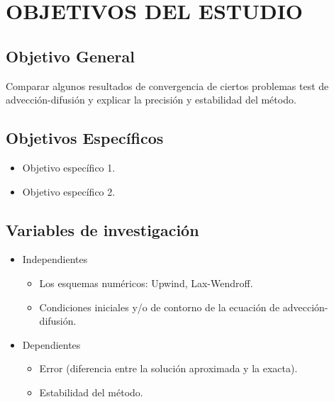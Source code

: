 \section{OBJETIVOS DEL ESTUDIO}
\subsection{Objetivo General}

Comparar algunos resultados de convergencia de ciertos problemas
test de advección-difusión y explicar la precisión y estabilidad del método.

\subsection{Objetivos Específicos}
\begin{itemize}
	\item Objetivo específico 1.

	\item Objetivo específico 2.
\end{itemize}

\subsection{Variables de investigación}

\begin{itemize}
	\item Independientes

	      \begin{itemize}
		      \item Los esquemas numéricos: Upwind, Lax-Wendroff.
		      \item Condiciones iniciales y/o de contorno de la ecuación de advección-difusión.
	      \end{itemize}

	\item Dependientes
	      \begin{itemize}
		      \item

		            Error (diferencia entre la solución aproximada y la exacta).

		      \item

		            Estabilidad del método.
	      \end{itemize}
\end{itemize}
